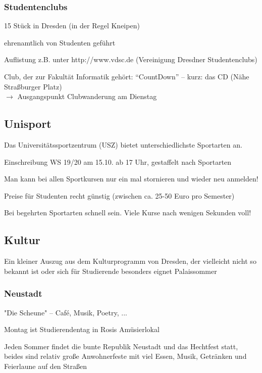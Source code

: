 \documentclass[a4paper,12pt]{report}
\begin{document}
\subsubsection{Studentenclubs}
\begin{itemize*}
	\item 15 Stück in Dresden (in der Regel Kneipen)
	\item ehrenamtlich von Studenten geführt
	\item Auflistung z.B. unter http://www.vdsc.de (Vereinigung Dresdner Studentenclubs)
	\item Club, der zur Fakultät Informatik gehört: \enquote{CountDown} -- kurz: das CD (Nähe Straßburger Platz)\\
	$\rightarrow$ Ausgangspunkt Clubwanderung am Dienstag
\end{itemize*}

\subsection{Unisport}
\begin{itemize*}
	\item Das Universitätssportzentrum (USZ) bietet unterschiedlichste Sportarten an.

	\item Einschreibung WS 19/20 am 15.10. ab 17 Uhr, gestaffelt nach Sportarten
	\item Man kann  bei allen Sportkursen nur ein mal stornieren und wieder neu anmelden! 
	\item Preise für Studenten recht günstig (zwischen ca. 25-50 Euro pro Semester)
	\item Bei begehrten Sportarten schnell sein. Viele Kurse nach wenigen Sekunden voll!
\end{itemize*}

\subsection{Kultur}
Ein kleiner Auszug aus dem Kulturprogramm von Dresden, der vielleicht nicht so bekannt ist oder sich für Studierende besonders eignet
Palaissommer

\subsubsection{Neustadt}
\begin{itemize*}
	\item "Die Scheune" -- Café, Musik, Poetry, ...
	\item Montag ist Studierendentag in Rosis Amüsierlokal
	\item Jeden Sommer findet die bunte Republik Neustadt und das Hechtfest statt, beides sind relativ große Anwohnerfeste mit viel Essen, Musik, Getränken und Feierlaune auf den Straßen
\end{itemize*}
\end{document}
